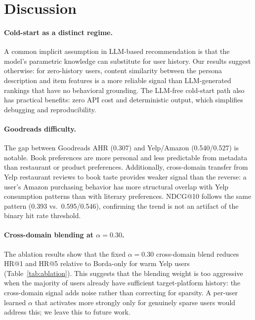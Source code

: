 \documentclass[11pt]{article}
\begin{document}
\section{Discussion}

\paragraph{Cold-start as a distinct regime.}
A common implicit assumption in LLM-based recommendation is that the model's
parametric knowledge can substitute for user history.
Our results suggest otherwise: for zero-history users, content similarity
between the persona description and item features is a more reliable signal
than LLM-generated rankings that have no behavioral grounding.
The LLM-free cold-start path also has practical benefits: zero API cost and
deterministic output, which simplifies debugging and reproducibility.

\paragraph{Goodreads difficulty.}
The gap between Goodreads AHR (0.307) and Yelp/Amazon (0.540/0.527) is
notable.
Book preferences are more personal and less predictable from metadata than
restaurant or product preferences.
Additionally, cross-domain transfer from Yelp restaurant reviews to book taste
provides weaker signal than the reverse: a user's Amazon purchasing behavior
has more structural overlap with Yelp consumption patterns than with literary
preferences.
NDCG@10 follows the same pattern (0.393 vs.\ 0.595/0.546), confirming the
trend is not an artifact of the binary hit rate threshold.

\paragraph{Cross-domain blending at $\alpha = 0.30$.}
The ablation results show that the fixed $\alpha = 0.30$ cross-domain blend
reduces HR@1 and HR@5 relative to Borda-only for warm Yelp users (Table~\ref{tab:ablation}).
This suggests that the blending weight is too aggressive when the majority of
users already have sufficient target-platform history: the cross-domain signal
adds noise rather than correcting for sparsity.
A per-user learned $\alpha$ that activates more strongly only for genuinely
sparse users would address this; we leave this to future work.
\end{document}
